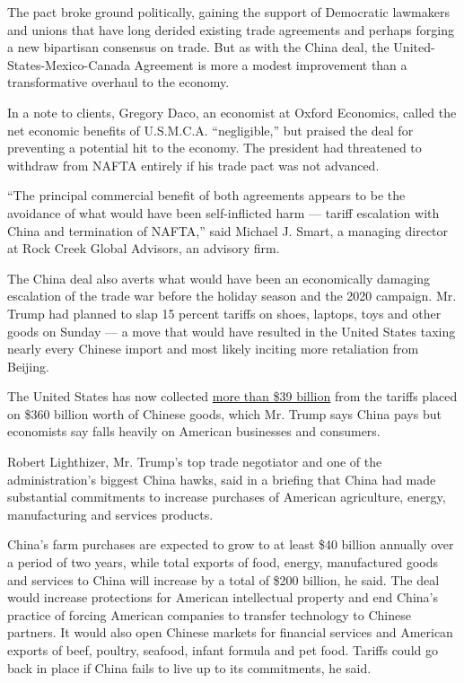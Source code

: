 The pact broke ground politically, gaining the support of Democratic
lawmakers and unions that have long derided existing trade agreements
and perhaps forging a new bipartisan consensus on trade. But as with the
China deal, the United-States-Mexico-Canada Agreement is more a modest
improvement than a transformative overhaul to the economy.

In a note to clients, Gregory Daco, an economist at Oxford Economics,
called the net economic benefits of U.S.M.C.A. ``negligible,'' but
praised the deal for preventing a potential hit to the economy. The
president had threatened to withdraw from NAFTA entirely if his trade
pact was not advanced.

``The principal commercial benefit of both agreements appears to be the
avoidance of what would have been self-inflicted harm --- tariff
escalation with China and termination of NAFTA,'' said Michael J. Smart,
a managing director at Rock Creek Global Advisors, an advisory firm.

The China deal also averts what would have been an economically damaging
escalation of the trade war before the holiday season and the 2020
campaign. Mr. Trump had planned to slap 15 percent tariffs on shoes,
laptops, toys and other goods on Sunday --- a move that would have
resulted in the United States taxing nearly every Chinese import and
most likely inciting more retaliation from Beijing.

The United States has now collected
\href{https://www.cbp.gov/newsroom/stats/trade}{more than \$39 billion}
from the tariffs placed on \$360 billion worth of Chinese goods, which
Mr. Trump says China pays but economists say falls heavily on American
businesses and consumers.

Robert Lighthizer, Mr. Trump's top trade negotiator and one of the
administration's biggest China hawks, said in a briefing that China had
made substantial commitments to increase purchases of American
agriculture, energy, manufacturing and services products.

China's farm purchases are expected to grow to at least \$40 billion
annually over a period of two years, while total exports of food,
energy, manufactured goods and services to China will increase by a
total of \$200 billion, he said. The deal would increase protections for
American intellectual property and end China's practice of forcing
American companies to transfer technology to Chinese partners. It would
also open Chinese markets for financial services and American exports of
beef, poultry, seafood, infant formula and pet food. Tariffs could go
back in place if China fails to live up to its commitments, he said.

